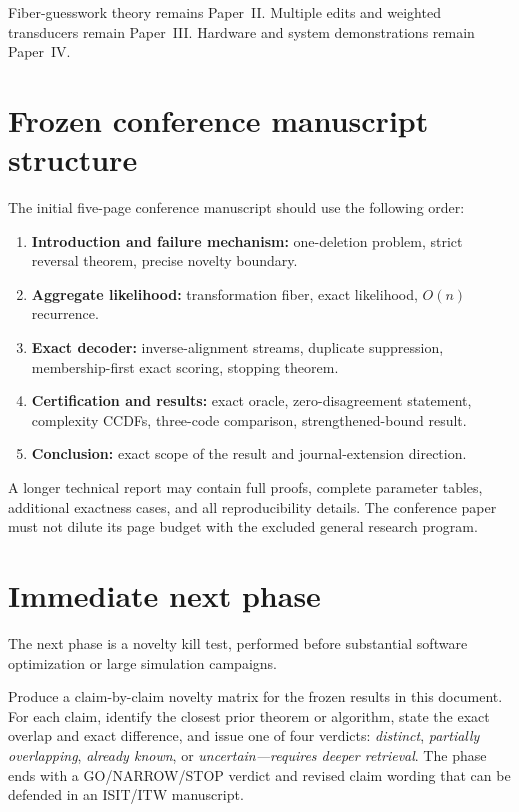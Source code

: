 \documentclass[11pt]{article}
\theoremstyle{definition}
\theoremstyle{remark}
\begin{document}
Fiber-guesswork theory remains Paper~II. Multiple edits and weighted transducers remain Paper~III. Hardware and system demonstrations remain Paper~IV.

\section{Frozen conference manuscript structure}

The initial five-page conference manuscript should use the following order:
\begin{enumerate}
  \item \textbf{Introduction and failure mechanism:} one-deletion problem, strict reversal theorem, precise novelty boundary.
  \item \textbf{Aggregate likelihood:} transformation fiber, exact likelihood, $O(n)$ recurrence.
  \item \textbf{Exact decoder:} inverse-alignment streams, duplicate suppression, membership-first exact scoring, stopping theorem.
  \item \textbf{Certification and results:} exact oracle, zero-disagreement statement, complexity CCDFs, three-code comparison, strengthened-bound result.
  \item \textbf{Conclusion:} exact scope of the result and journal-extension direction.
\end{enumerate}

A longer technical report may contain full proofs, complete parameter tables, additional exactness cases, and all reproducibility details. The conference paper must not dilute its page budget with the excluded general research program.

\section{Immediate next phase}
\label{sec:next}

The next phase is a novelty kill test, performed before substantial software optimization or large simulation campaigns.

\begin{gatebox}
Produce a claim-by-claim novelty matrix for the frozen results in this document. For each claim, identify the closest prior theorem or algorithm, state the exact overlap and exact difference, and issue one of four verdicts: \emph{distinct}, \emph{partially overlapping}, \emph{already known}, or \emph{uncertain---requires deeper retrieval}. The phase ends with a GO/NARROW/STOP verdict and revised claim wording that can be defended in an ISIT/ITW manuscript.
\end{gatebox}
\end{document}
